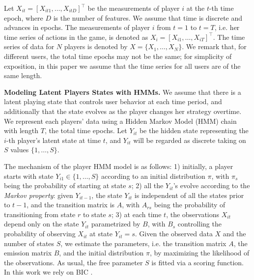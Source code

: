 Let $X_{it} = [X_{it1}, \ldots, X_{itD}]^\top$ be the measurements of player $i$ at the $t$-th time epoch, 
where $D$ is the number of features.  We assume that time is discrete and advances in epochs. 
The measurements of player $i$ from $t = 1$ to  $t = T$, i.e. her time series of actions in the game,  is denoted as $X_{i} = [X_{i1}, \ldots, X_{iT}]^\top$. The time series of data for   $N$ players is denoted by $X = \{ X_1, \ldots, X_N \}$.  We remark that, for different users, the total time epochs may not be the same; for simplicity of exposition, in this paper we assume  
that the time series for all users are of the same length.

{\bf Modeling Latent Players States with HMMs.}
We assume that there is a latent playing state that controls user behavior at each time period, and additionally that the state evolves  as the player changes her strategy overtime.  We represent each players' data using a Hidden Markov Model (HMM) \cite{hmm} chain with length $T$, the total time epochs.  Let $Y_{it}$ be the hidden state representing 
the $i$-th player's  latent state at time $t$, and $Y_{it}$ will be regarded as discrete taking on $S$ values $\{1,\ldots,S\}$. 


The mechanism of the player HMM model is as follows: 1) initially, a player starts with state 
$Y_{i1} \in \{1, \ldots, S\}$ according to an initial distribution $\pi$,  with $\pi_s$ being 
the probability of starting at state $s$; 2) all the $Y_{it}$'s  evolve according to the 
{\it Markov property}: given $Y_{i{t-1}}$, the state $Y_{it}$ is independent of all the 
states prior to $t-1$, and the transition matrix is $A$, with $A_{rs}$ being the probability of 
transitioning from state $r$ to state $s$; 3) at each time $t$, the observations $X_{it}$ 
depend only on the state $Y_{it}$ parametrized by $B$, with $B_s$ controlling the probability 
of observing $X_{it}$ at state $Y_{it} = s$. 
Given the observed data $X$ and the number of states $S$, we  estimate the parameters, i.e. the transition matrix $A$, the emission matrix $B$, and the initial distribution $\pi$, by maximizing the 
likelihood of the observations. As usual, the free parameter $S$ is fitted via a scoring function.  In this work we rely on  BIC \cite{bic}.

